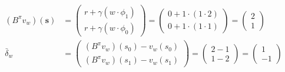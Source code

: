 \documentclass{exam}
\begin{document}
\begin{problem}
\begin{enumerate}
\begin{solutionorlines}[2in]
\begin{align*}
        (B^{\pi} v_w)(\mathbf{s}) &= \begin{pmatrix}
        r + \gamma (w \cdot \phi_1)\\
        r + \gamma (w \cdot \phi_0)
        \end{pmatrix} = \begin{pmatrix}
        0 + 1 \cdot (1 \cdot 2)\\
        0 + 1 \cdot (1 \cdot 1)
        \end{pmatrix} = \begin{pmatrix}
        2\\
        1
        \end{pmatrix}\\
        \bar{\delta}_w &= \begin{pmatrix}
        (B^{\pi} v_w)(s_0) - v_w(s_0)\\
        (B^{\pi} v_w)(s_1) - v_w(s_1)
        \end{pmatrix} = \begin{pmatrix}
        2 - 1\\
        1 - 2
        \end{pmatrix} = \begin{pmatrix}
        1\\
        -1
        \end{pmatrix}
    \end{align*}
    

\end{solutionorlines}
\end{enumerate}
\end{problem}
\end{document}

